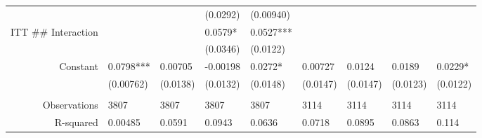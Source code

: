 \begin{tabular}{rrrrrrrrr}
      & \multicolumn{1}{l}{} & \multicolumn{1}{l}{} & \multicolumn{1}{l}{(0.0292)} & \multicolumn{1}{l}{(0.00940)} & \multicolumn{1}{l}{} & \multicolumn{1}{l}{} & \multicolumn{1}{l}{} & \multicolumn{1}{l}{} \\
ITT \#\# Interaction & \multicolumn{1}{l}{} & \multicolumn{1}{l}{} & \multicolumn{1}{l}{0.0579*} & \multicolumn{1}{l}{0.0527***} & \multicolumn{1}{l}{} & \multicolumn{1}{l}{} & \multicolumn{1}{l}{} & \multicolumn{1}{l}{} \\
      & \multicolumn{1}{l}{} & \multicolumn{1}{l}{} & \multicolumn{1}{l}{(0.0346)} & \multicolumn{1}{l}{(0.0122)} & \multicolumn{1}{l}{} & \multicolumn{1}{l}{} & \multicolumn{1}{l}{} & \multicolumn{1}{l}{} \\
Constant & \multicolumn{1}{l}{0.0798***} & \multicolumn{1}{l}{0.00705} & \multicolumn{1}{l}{-0.00198} & \multicolumn{1}{l}{0.0272*} & \multicolumn{1}{l}{0.00727} & \multicolumn{1}{l}{0.0124} & \multicolumn{1}{l}{0.0189} & \multicolumn{1}{l}{0.0229*} \\
      & \multicolumn{1}{l}{(0.00762)} & \multicolumn{1}{l}{(0.0138)} & \multicolumn{1}{l}{(0.0132)} & \multicolumn{1}{l}{(0.0148)} & \multicolumn{1}{l}{(0.0147)} & \multicolumn{1}{l}{(0.0147)} & \multicolumn{1}{l}{(0.0123)} & \multicolumn{1}{l}{(0.0122)} \\
      & \multicolumn{1}{l}{} & \multicolumn{1}{l}{} & \multicolumn{1}{l}{} & \multicolumn{1}{l}{} & \multicolumn{1}{l}{} & \multicolumn{1}{l}{} & \multicolumn{1}{l}{} & \multicolumn{1}{l}{} \\
      \midrule
Observations & \multicolumn{1}{l}{3807} & \multicolumn{1}{l}{3807} & \multicolumn{1}{l}{3807} & \multicolumn{1}{l}{3807} & \multicolumn{1}{l}{3114} & \multicolumn{1}{l}{3114} & \multicolumn{1}{l}{3114} & \multicolumn{1}{l}{3114} \\
R-squared & \multicolumn{1}{l}{0.00485} & \multicolumn{1}{l}{0.0591} & \multicolumn{1}{l}{0.0943} & \multicolumn{1}{l}{0.0636} & \multicolumn{1}{l}{0.0718} & \multicolumn{1}{l}{0.0895} & \multicolumn{1}{l}{0.0863} & \multicolumn{1}{l}{0.114} \\
\bottomrule
\end{tabular}%
